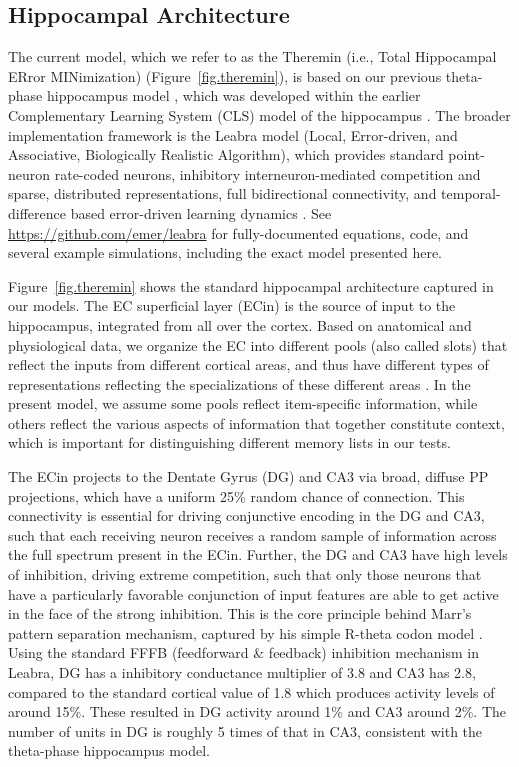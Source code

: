 \documentclass[11pt,twoside]{article}
\newif\myifpdf
\begin{document}
\subsection{Hippocampal Architecture}

The current model, which we refer to as the Theremin (i.e., Total Hippocampal ERror MINimization) (Figure~\ref{fig.theremin}), is based on our previous theta-phase hippocampus model \citep{KetzMorkondaOReilly13}, which was developed within the earlier Complementary Learning System (CLS) model of the hippocampus \citep{NormanOReilly03,OReillyRudy01}.  The broader implementation framework is the Leabra model (Local, Error-driven, and Associative, Biologically Realistic Algorithm), which provides standard point-neuron rate-coded neurons, inhibitory interneuron-mediated competition and sparse, distributed representations, full bidirectional connectivity, and temporal-difference based error-driven learning dynamics \citep{OReillyMunakata00,OReillyMunakataFrankEtAl12}.  See \url{https://github.com/emer/leabra} for fully-documented equations, code, and several example simulations, including the exact model presented here.

Figure~\ref{fig.theremin} shows the standard hippocampal architecture captured in our models. The EC superficial layer (ECin) is the source of input to the hippocampus, integrated from all over the cortex.  Based on anatomical and physiological data, we organize the EC into different pools (also called slots) that reflect the inputs from different cortical areas, and thus have different types of representations reflecting the specializations of these different areas \citep{WitterDoanJacobsenEtAl17}.  In the present model, we assume some pools reflect item-specific information, while others reflect the various aspects of information that together constitute context, which is important for distinguishing different memory lists in our tests.

The ECin projects to the Dentate Gyrus (DG) and CA3 via broad, diffuse PP projections, which have a uniform 25\% random chance of connection.  This connectivity is essential for driving conjunctive encoding in the DG and CA3, such that each receiving neuron receives a random sample of information across the full spectrum present in the ECin.  Further, the DG and CA3 have high levels of inhibition, driving extreme competition, such that only those neurons that have a particularly favorable conjunction of input features are able to get active in the face of the strong inhibition.  This is the core principle behind Marr's pattern separation mechanism, captured by his simple R-theta codon model \citep{Marr71}.  Using the standard FFFB (feedforward \& feedback) inhibition mechanism in Leabra, DG has a inhibitory conductance multiplier of 3.8 and CA3 has 2.8, compared to the standard cortical value of 1.8 which produces activity levels of around 15\%.  These resulted in DG activity around 1\% and CA3 around 2\%.  The number of units in DG is roughly 5 times of that in CA3, consistent with the theta-phase hippocampus model.
\end{document}

